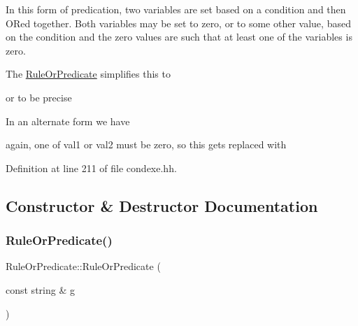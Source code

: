 In this form of predication, two variables are set based on a condition and then O\+Red together. Both variables may be set to zero, or to some other value, based on the condition and the zero values are such that at least one of the variables is zero. 
\begin{DoxyCode}{0}
\end{DoxyCode}
 The \mbox{\hyperlink{class_rule_or_predicate}{Rule\+Or\+Predicate}} simplifies this to 
\begin{DoxyCode}{0}
\end{DoxyCode}
 or to be precise 
\begin{DoxyCode}{0}
\end{DoxyCode}
 In an alternate form we have 
\begin{DoxyCode}{0}
\end{DoxyCode}
 again, one of val1 or val2 must be zero, so this gets replaced with 
\begin{DoxyCode}{0}
\end{DoxyCode}
 

Definition at line 211 of file condexe.\+hh.



\subsection{Constructor \& Destructor Documentation}
\mbox{\label{class_rule_or_predicate_aafc3664581fdf2f48313e070addaad31}} 
\subsubsection{\texorpdfstring{RuleOrPredicate()}{RuleOrPredicate()}}
{\footnotesize\ttfamily Rule\+Or\+Predicate\+::\+Rule\+Or\+Predicate (\begin{DoxyParamCaption}\item[{const string \&}]{g }\end{DoxyParamCaption})\hspace{0.3cm}{\ttfamily [inline]}}



